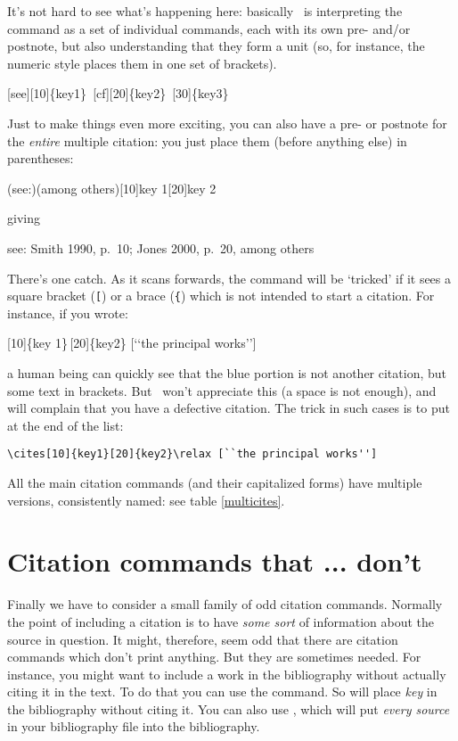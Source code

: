 It's not hard to see what's happening here: basically \biblatex\ is
interpreting the command as a set of individual  commands,
each with its own pre- and/or postnote, but also understanding that
they form a unit (so, for instance, the numeric style places them in
one set of brackets).
\begin{center}
\ttfamily
{}\colorbox{red!30}{[see][10]\{key1\}}\,%
\colorbox{green!30}{[cf][20]\{key2\}}\,%
\colorbox{blue!30}{[30]\{key3\}}
\end{center}

Just to make things even more exciting, you can also have a pre- or
postnote for the \emph{entire} multiple citation: you just place them
(before anything else) in parentheses:
\begin{center}
\ttfamily
{}(see:)(among others)[10]{key 1}[20]{key 2}
\end{center}
giving
\begin{center}
see: Smith 1990, p.\ 10; Jones 2000, p.\ 20, among others
\end{center}

There's one catch. As it scans forwards, the  command will
be `tricked' if it sees a square bracket (\texttt[) or a brace
(\texttt\{) which is not intended to start a citation. For instance,
if you wrote:
\begin{center}
\ttfamily
{}\colorbox{red!30}{[10]\{key
  1\}}\,\colorbox{green!30}{[20]\{key2\}}
\colorbox{blue!30}{[`{}`the principal works'{}']}
\end{center}
a human being can quickly see that the blue portion is not another
citation, but some text in brackets. But \biblatex\ won't appreciate
this (a space is not enough), and will complain that you have a
defective citation. The trick in such cases is to put  at
the end of the list:
\begin{center}
\verb|\cites[10]{key1}[20]{key2}\relax [``the principal works'']|
\end{center}

All the main citation commands (and their capitalized forms) have
multiple versions, consistently named: see table \ref{multicites}.

\section{Citation commands that ... don't}

Finally we have to consider a small family of odd citation
commands. Normally the point of including a citation is to have
\emph{some sort} of information about the source in question. It
might, therefore, seem odd that there are citation commands which
don't print anything. But they are sometimes needed. For instance, you
might want to include a work in the bibliography without actually
citing it in the text. To do that you can use the 
command. So  will place \emph{key} in the
bibliography without citing it. You can also use ,
which will put \emph{every source} in your bibliography file into the
bibliography.

